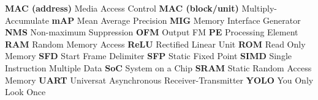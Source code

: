 \textbf{MAC (address)} Media Access Control\newline
\textbf{MAC (block/unit)} Multiply-Accumulate \newline
\textbf{mAP} Mean Average Precision\newline
\textbf{MIG} Memory Interface Generator\newline
\textbf{NMS} Non-maximum Suppression\newline
\textbf{OFM} Output FM \newline
\textbf{PE} Processing Element\newline
\textbf{RAM} Random Memory Access\newline
\textbf{ReLU} Rectified Linear Unit \newline
\textbf{ROM} Read Only Memory\newline
\textbf{SFD} Start Frame Delimiter\newline
\textbf{SFP} Static Fixed Point\newline
\textbf{SIMD} Single Instruction Multiple Data\newline
\textbf{SoC} System on a Chip\newline
\textbf{SRAM} Static Random Access Memory\newline
\textbf{UART} Universat Asynchronous Receiver-Transmitter\newline
\textbf{YOLO} You Only Look Once\newline
